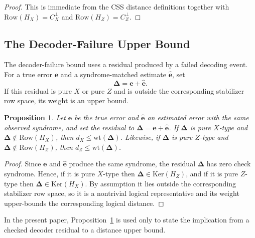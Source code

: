 \documentclass[11pt]{article}
\newcommand{\Ker}{\mathrm{Ker}}
\newcommand{\Row}{\mathrm{Row}}
\newcommand{\wt}{\mathrm{wt}}
\newcommand{\markededit}[1]{#1}
\theoremstyle{uprightthm}
\newtheorem{proposition}[theorem]{Proposition}
\begin{document}
\begin{proof}
This is immediate from the CSS distance definitions together with $\Row(H_X)=C_X^\perp$ and $\Row(H_Z)=C_Z^\perp$.
\end{proof}

\subsection{The Decoder-Failure Upper Bound}
The decoder-failure bound \markededit{uses} a residual produced by a failed
decoding event.  For a true error $\mathbf e$ and a syndrome-matched estimate
$\hat{\mathbf e}$, set
\[
\mathbf{\Delta}=\mathbf{e}+\hat{\mathbf{e}}.
\]
If this residual is pure $X$ or pure $Z$ and is outside the corresponding
stabilizer row space, its weight is an upper bound.

\begin{proposition}
\label{prop:decoder-failure-upper-en}
Let $\mathbf{e}$ be the true error and $\hat{\mathbf{e}}$ an estimated error
with the same observed syndrome, and set the residual to
$\mathbf{\Delta}=\mathbf{e}+\hat{\mathbf{e}}$.
If $\mathbf{\Delta}$ is pure $X$-type and $\mathbf{\Delta}\notin\Row(H_X)$,
then $d_X\le \wt(\mathbf{\Delta})$.
Likewise, if $\mathbf{\Delta}$ is pure $Z$-type and
$\mathbf{\Delta}\notin\Row(H_Z)$, then $d_Z\le \wt(\mathbf{\Delta})$.
\end{proposition}
\begin{proof}
Since $\mathbf{e}$ and $\hat{\mathbf{e}}$ produce the same syndrome, the
residual $\mathbf{\Delta}$ has zero check syndrome.
Hence, if it is pure $X$-type then $\mathbf{\Delta}\in\Ker(H_Z)$, and if it is
pure $Z$-type then $\mathbf{\Delta}\in\Ker(H_X)$.
By assumption it lies outside the corresponding stabilizer row space, so it is
a nontrivial logical representative and its weight upper-bounds the
corresponding logical distance.
\end{proof}

In the present paper, Proposition~\ref{prop:decoder-failure-upper-en} is used
only to state the implication from a \markededit{checked decoder residual} to a distance
upper bound.
\end{document}
